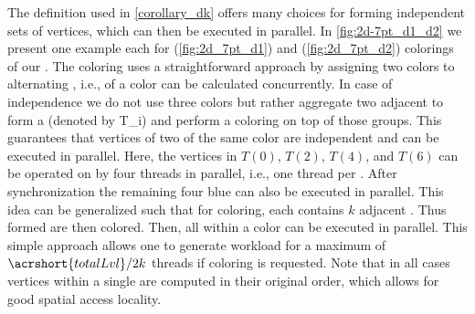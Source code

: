 
The definition used in \cref{corollary_dk} offers many choices for
forming \DK independent sets of vertices, which can then be executed
in parallel.  In \cref{fig:2d-7pt_d1_d2} we present one example each
for \DONE (\cref{fig:2d_7pt_d1}) and \DTWO (\cref{fig:2d_7pt_d2})
colorings of our \stex. The \DONE coloring uses a straightforward
approach by assigning two colors to alternating \levels, i.e., \levels
of a color can be calculated concurrently. In case of \DTWO
independence we do not use three colors but rather aggregate two
adjacent \levels to form a \textit{\levelGroup} (denoted by
\acrshort{T_i}) and perform a \DONE coloring on top of those
groups. This guarantees that vertices of two \levelGroups of the same
color are \DTWO independent and can be executed in parallel. Here, the
vertices in $T(0)$, $T(2)$, $T(4)$, and $T(6)$ can be operated on by
four threads in parallel, i.e., one thread per \levelGroup.  After
synchronization the remaining four blue \levelGroups can also be
executed in parallel. This idea can be generalized such that for \DK
coloring, each \levelGroup contains $k$ adjacent \levels.
Thus formed \levelGroups are then \DONE
colored. Then, all \levelGroups within a color can be executed in
parallel. This simple approach allows one to generate workload for
a maximum of ${\acrshort{totalLvl}}/{2 k}$ threads if \DK coloring is
requested. Note that in all cases vertices within a single \levelGroup
 are computed in their original order, which allows for good
spatial access locality.
 
